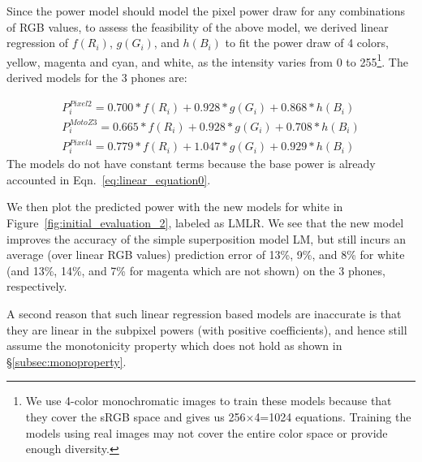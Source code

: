 
Since the power model should model the pixel power draw for
any combinations of RGB values, to assess the feasibility of the above model, we 
derived linear regression of $f(R_{i})$, $g(G_{i})$, and $h(B_{i})$ 
to fit the power draw of 4 colors, yellow, magenta and cyan, and white,
as the intensity varies from 0 to 255\footnote{We use 4-color monochromatic images to train these
  models because that they cover the sRGB space and gives us 256$\times$4=1024 equations.
  Training the models using real images may not cover the entire color space or provide
  enough diversity.}. The derived models
for the 3 phones are:

\vspace{-0.1in}
{\small
  \begin{eqnarray}
	P_i^{Pixel 2} = 0.700*f(R_i) + 0.928*g(G_i) + 0.868*h(B_i) \\
	P_i^{Moto Z3} = 0.665*f(R_i) + 0.928*g(G_i) + 0.708*h(B_i) \\
	P_i^{Pixel 4} = 0.779*f(R_i) + 1.047*g(G_i) + 0.929*h(B_i)
	\label{eq:linear_model_linear_regression}
  \end{eqnarray}
}
\noindent
The models do not have constant terms because the base power is
already accounted in Eqn.~\ref{eq:linear_equation0}.

We then plot the predicted power with the new models for white in
Figure~\ref{fig:initial_evaluation_2}, labeled as LMLR.  We see that the new model
improves the accuracy of the simple superposition model LM, but still
incurs an average (over linear RGB values)
prediction error of 13\%, 9\%, and 8\% for white
(and 13\%, 14\%, and 7\% for magenta which are not shown) on the 3 phones, respectively.

A second reason that such linear regression based models are inaccurate
is that they are linear in the subpixel powers (with positive coefficients), and hence still
assume the monotonicity property which does not hold as shown
in \S\ref{subsec:monoproperty}.

